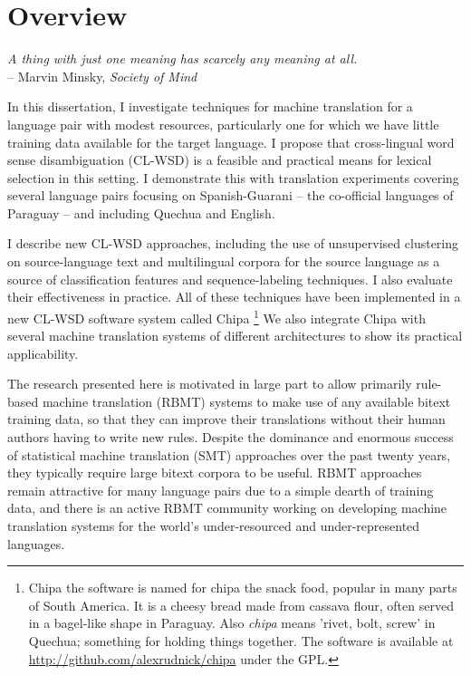 \chapter{Overview}

\begin{centering}
\emph{A thing with just one meaning has scarcely any meaning at
all.} \\
-- Marvin Minsky, \emph{Society of Mind} \cite{minsky1988society} \\
\end{centering}
\bigskip

In this dissertation, I investigate techniques for machine translation for
a language pair with modest resources, particularly one for which we have
little training data available for the target language. I propose
that cross-lingual word sense disambiguation (CL-WSD) is a feasible and
practical means for lexical selection in this setting. I demonstrate
this with translation experiments covering several language pairs focusing on
Spanish-Guarani -- the co-official languages of Paraguay -- and including
Quechua and English.

I describe new CL-WSD approaches, including the use of unsupervised
clustering on source-language text and multilingual corpora for the source
language as a source of classification features and sequence-labeling
techniques. I also evaluate their effectiveness in practice. All of these
techniques have been implemented in a new CL-WSD software system called Chipa
\footnote{Chipa the software is named for chipa the snack food, popular in many
  parts of South America. It is a cheesy bread made from cassava flour, often
  served in a bagel-like shape in Paraguay.  Also \emph{chipa} means 'rivet,
  bolt, screw' in Quechua; something for holding things together.  The software
is available at \\ \url{http://github.com/alexrudnick/chipa} under the GPL.}
We also integrate Chipa with several machine translation systems of different
architectures to show its practical applicability.

The research presented here is motivated in large part to allow primarily
rule-based machine translation (RBMT) systems to make use of any available
bitext training data, so that they can improve their translations without their
human authors having to write new rules.  Despite the dominance and enormous
success of statistical machine translation (SMT) approaches over the past
twenty years, they typically require large bitext corpora to be useful. RBMT
approaches remain attractive for many language pairs due to a simple dearth of
training data, and there is an active RBMT community working on developing
machine translation systems for the world's under-resourced and
under-represented languages.

